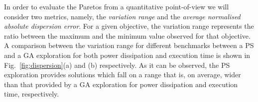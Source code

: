 In order to evaluate the Paretos from a quantitative point-of-view we
will consider two metrics, namely, the \emph{variation range} and the
\emph{average normalised absolute dispersion error}. For a given
objective, the variation range represents the ratio between the
maximum and the minimum value observed for that objective. A
comparison between the variation range for different benchmarks
between a PS and a GA exploration for both power dissipation and
execution time is shown in Fig.~\ref{fig:dispersion}(a) and (b)
respectively. As it can be observed, the PS exploration provides solutions which fall on a
range that is, on average, wider than that provided by a
GA exploration for power dissipation and execution time, respectively.

